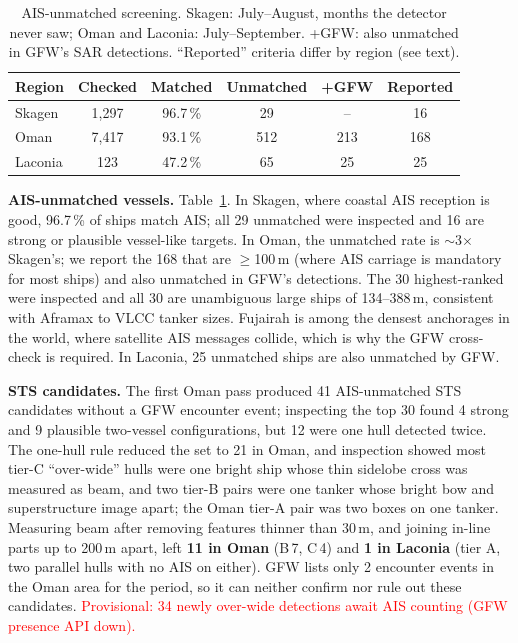 \documentclass[conference]{IEEEtran}
\newcommand{\tbd}[1]{\textcolor{red}{#1}}
\begin{document}
\begin{table}[t]
\caption{AIS-unmatched screening. Skagen: July--August, months the detector never saw;
Oman and Laconia: July--September. +GFW: also unmatched in GFW's SAR detections. ``Reported'' criteria differ by region
(see text).}
\label{tab:unmatched}
\centering\footnotesize
\setlength{\tabcolsep}{3pt}
\begin{tabular}{lccccc}
\toprule
Region & Checked & Matched & Unmatched & +GFW & Reported \\
\midrule
Skagen  & 1,297 & 96.7\,\% & 29  & --  & 16 \\
Oman    & 7,417 & 93.1\,\% & 512 & 213 & 168 \\
Laconia & 123   & 47.2\,\% & 65  & 25  & 25 \\
\bottomrule
\end{tabular}
\end{table}

\textbf{AIS-unmatched vessels.} Table~\ref{tab:unmatched}. In Skagen, where coastal AIS
reception is good, 96.7\,\% of ships match AIS; all 29 unmatched were inspected and 16
are strong or plausible vessel-like targets. In Oman, the unmatched rate is
$\sim$3$\times$ Skagen's; we report the 168 that are $\ge$100\,m (where AIS carriage is
mandatory for most ships) and also unmatched in GFW's detections. The 30 highest-ranked
were inspected and all 30 are unambiguous large ships of 134--388\,m, consistent with
Aframax to VLCC tanker sizes. Fujairah is among the densest anchorages in the world,
where satellite AIS messages collide, which is why the GFW cross-check is required. In
Laconia, 25 unmatched ships are also unmatched by GFW. %

\textbf{STS candidates.} The first Oman pass produced 41 AIS-unmatched STS candidates
without a GFW encounter event; inspecting the top 30 found 4 strong and 9 plausible
two-vessel configurations, but 12 were one hull detected twice. The one-hull rule
reduced the set to 21 in Oman, and inspection showed most tier-C ``over-wide'' hulls
were one bright ship whose thin sidelobe cross was measured as beam, and two tier-B
pairs were one tanker whose bright bow and superstructure image apart; the Oman
tier-A pair was two boxes on one tanker. Measuring beam
after removing features thinner than 30\,m, and joining in-line parts up to 200\,m
apart, left \textbf{11 in Oman} (B\,7, C\,4) and \textbf{1 in Laconia} (tier A,
two parallel hulls with no AIS on either).
GFW lists only 2 encounter events in the Oman area for the period, so it can neither
confirm nor rule out these candidates. \tbd{Provisional: 34 newly over-wide detections
await AIS counting (GFW presence API down).} %
\end{document}
